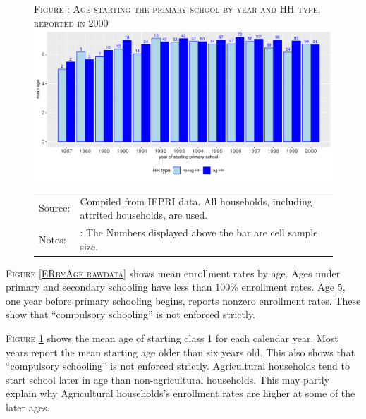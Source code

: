 \documentclass[12pt,letterpaper]{article}\usepackage[margin=1in]{geometry}
\newcommand{\0}{\ensuremath{\mbox{\boldmath $0$}}}
\begin{document}
{\begin{figure}[h!]
\hfil\textsc{\footnotesize Figure \thefigure: Age starting the primary school by year and HH type, reported in 2000\label{AgeAtClass1byAge rawdata}}\\
\hfil \includegraphics[width=.7\paperwidth]{Figures/AgeAtClass1Enrollment.pdf}\\
\renewcommand{\arraystretch}{1}
\hfil\begin{tabular}{>{\hfill\scriptsize}p{1cm}<{}>{\scriptsize}p{12cm}<{\hfill}}
Source:& Compiled from IFPRI data. All households, including attrited households, are used.\\[-1ex]
Notes:&: The Numbers displayed above the bar are cell sample size. \\[-1ex]
\end{tabular}
\end{figure}

\textsc{\footnotesize Figure \ref{ERbyAge rawdata}} shows mean enrollment rates by age. Ages under primary and secondary schooling have less than 100\% enrollment rates. Age 5, one year before primary schooling begins, reports nonzero enrollment rates. These show that ``compulsory schooling'' is not enforced strictly. 

\textsc{\footnotesize Figure \ref{AgeAtClass1byAge rawdata}} shows the mean age of starting class 1 for each calendar year. Most years report the mean starting age older than six years old. This also shows that ``compulsory schooling'' is not enforced strictly. Agricultural households tend to start school later in age than non-agricultural households. This may partly explain why Agricultural households's enrollment rates are higher at some of the later ages. 




}
\end{document}
